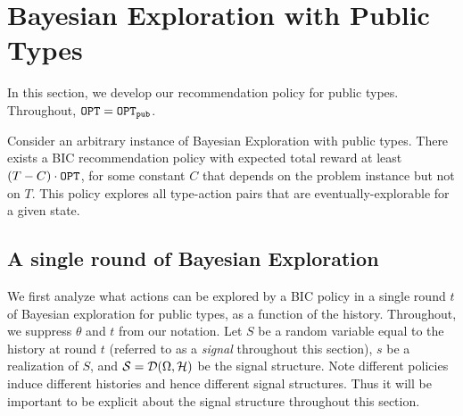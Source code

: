 
\section{Bayesian Exploration with Public Types}
\label{sec:public}

In this section, we develop our recommendation policy for public types. Throughout, $\mathtt{OPT} = \mathtt{OPT}_{\mathtt{pub}}$.

\begin{theorem}
\label{thm:public}
Consider an arbitrary instance of Bayesian Exploration with public types.
There exists a BIC recommendation policy with expected total reward at least $\left(T - C \right) \cdot \mathtt{OPT}$, for some constant $C$ that depends on the problem instance but not on $T$. This policy explores all type-action pairs that are eventually-explorable for a given state.
\end{theorem}

\subsection{A single round of Bayesian Exploration}
\label{sec:public_single}

We first analyze what actions can be explored by a BIC policy in a single round $t$ of Bayesian exploration for public types, as a function of the history. Throughout, we suppress $\theta$ and $t$ from our notation. 
Let $S$ be a random variable equal to the history at round $t$ (referred to as a {\em signal} throughout this section), $s$ be a realization of $S$, and $\mathcal{S}=\mathcal{D}(\Omega,\mathcal{H})$ be the signal structure.  Note different policies induce different histories and hence different signal structures.  Thus it will be important to be explicit about the signal structure throughout this section.

%

